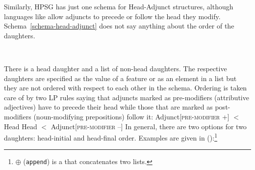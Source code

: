 \documentclass[output=paper
	        ,collection
	        ,collectionchapter
 	        ,biblatex
                ,babelshorthands
                ,newtxmath
                ,draftmode
                ,colorlinks, citecolor=brown
]{langscibook}
\begin{document}
Similarly, HPSG has just one schema for Head-Adjunct structures, although languages like
 allow adjuncts to precede or follow the head they modify. Schema~\ref{schema-head-adjunct} does not say anything
about the order of the daughters.
\begin{schema}
\label{schema-head-adjunct}
 \impl\\
\end{schema}
There is a head daughter and a list of non-head daughters. The respective daughters are specified as
the value of a feature or as an element in a list but they are not ordered with respect to each
other in the schema. Ordering is taken care of by two LP rules saying that adjuncts marked
as pre-modifiers (\eg attributive adjectives) have to precede their head while those that are marked
as post-modifiers (noun-modifying prepositions) follow it:
\eal
\ex Adjunct[\textsc{pre-modifier} +] $<$ Head
\ex Head $<$ Adjunct[\textsc{pre-modifier} --]
\zl
In general, there are two options for two daughters: head-initial and head-final order. Examples are
given in ():\footnote{%
$\oplus$\is{$\oplus$} (\texttt{append}) is a  that concatenates two lists. 
}
\eal
\ex {}
\end{document}
